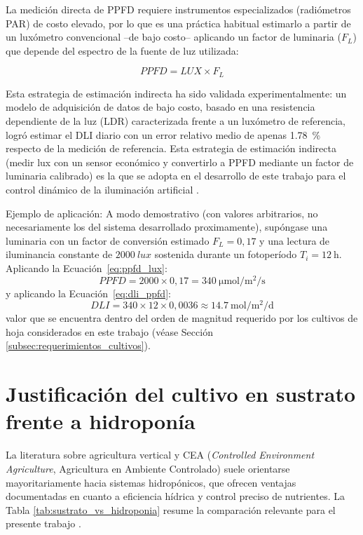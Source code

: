 La medición directa de PPFD requiere instrumentos especializados (radiómetros PAR) de costo elevado, por lo que es una práctica habitual estimarlo a partir de un luxómetro convencional --de bajo costo-- aplicando un factor de luminaria ($F_L$) que depende del espectro de la fuente de luz utilizada:

\begin{equation}
    PPFD = LUX \times F_L
    \label{eq:ppfd_lux}
\end{equation}

\noindent Esta estrategia de estimación indirecta ha sido validada experimentalmente: un modelo de adquisición de datos de bajo costo, basado en una
resistencia dependiente de la luz (LDR) caracterizada frente a un luxómetro de referencia, logró estimar el DLI diario con un error relativo medio de apenas \SI{1.78}{\percent} respecto de la medición de referencia. Esta estrategia de estimación indirecta (medir lux con un sensor económico y convertirlo a PPFD mediante un factor de luminaria calibrado) es la que
se adopta en el desarrollo de este trabajo para el control dinámico de la iluminación artificial \cite{deocampo2017}.

Ejemplo de aplicación: A modo demostrativo (con valores arbitrarios, no necesariamente los del sistema desarrollado proximamente), supóngase una luminaria con un factor de conversión estimado $F_L = 0{,}17$ y una lectura de iluminancia constante de $\SI{2000}{lux}$ sostenida durante un fotoperíodo $T_i = \SI{12}{\hour}$. Aplicando la Ecuación~\ref{eq:ppfd_lux}:
\begin{equation*}
    PPFD = 2000 \times 0{,}17 = \SI{340}{\micro\mole\per\square\meter\per\second}
\end{equation*}
y aplicando la Ecuación~\ref{eq:dli_ppfd}:
\begin{equation*}
    DLI = 340 \times 12 \times 0{,}0036 \approx \SI{14,7}{\mole\per\square\meter\per\day}
\end{equation*}
valor que se encuentra dentro del orden de magnitud requerido por los cultivos de hoja considerados en este trabajo (véase Sección \ref{subsec:requerimientos_cultivos}).

\section{Justificación del cultivo en sustrato frente a hidroponía}
\label{subsec:sustrato_vs_hidroponia}

La literatura sobre agricultura vertical y CEA (\textit{Controlled Environment Agriculture}, Agricultura en Ambiente Controlado) suele orientarse mayoritariamente hacia sistemas hidropónicos, que ofrecen ventajas documentadas en cuanto a eficiencia hídrica y control preciso de nutrientes. La Tabla \ref{tab:sustrato_vs_hidroponia} resume la comparación relevante para el presente trabajo \cite{cea_definicion}.

